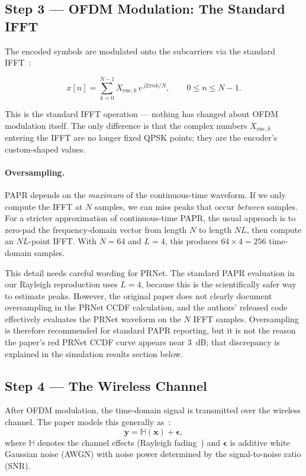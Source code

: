 \subsection{Step 3 --- OFDM Modulation: The Standard IFFT}

The encoded symbols are modulated onto the subcarriers via the standard IFFT~\cite{kim2017novel}:
\begin{keyresult}
    \begin{equation}
        x[n] = \sum_{k=0}^{N-1} X_{\mathrm{enc},k}\, e^{\,j2\pi nk/N},
        \qquad 0 \le n \le N-1.
    \end{equation}
\end{keyresult}

This is the standard IFFT operation --- nothing has changed about OFDM modulation itself.  The only difference is that the complex numbers $X_{\mathrm{enc},k}$ entering the IFFT are no longer fixed QPSK points; they are the encoder's custom-shaped values.

\paragraph{Oversampling.}
PAPR depends on the \emph{maximum} of the continuous-time waveform. If we only compute the IFFT at $N$ samples, we can miss peaks that occur \emph{between} samples.  For a stricter approximation of continuous-time PAPR, the usual approach is to zero-pad the frequency-domain vector from length $N$ to length $NL$, then compute an $NL$-point IFFT.  With $N = 64$ and $L = 4$, this produces $64 \times 4 = 256$ time-domain samples.

This detail needs careful wording for PRNet.  The standard PAPR evaluation in our Rayleigh reproduction uses $L = 4$, because this is the scientifically safer way to estimate peaks.  However, the original paper does not clearly document oversampling in the PRNet CCDF calculation, and the authors' released code effectively evaluates the PRNet waveform on the $N$ IFFT samples.  Oversampling is therefore recommended for standard PAPR reporting, but it is not the reason the paper's red PRNet CCDF curve appears near 3~dB; that discrepancy is explained in the simulation results section below.


\subsection{Step 4 --- The Wireless Channel}

After OFDM modulation, the time-domain signal is transmitted over the wireless channel. The paper models this generally as~\cite{kim2017novel}:
\begin{equation*}
    \bm{y} = \mathbb{H}(\bm{x}) + \bm{\epsilon},
\end{equation*}
where $\mathbb{H}$ denotes the channel effects (Rayleigh fading~\cite{kim2017novel}) and $\bm{\epsilon}$ is additive white Gaussian noise (AWGN) with noise power determined by the signal-to-noise ratio (SNR).

